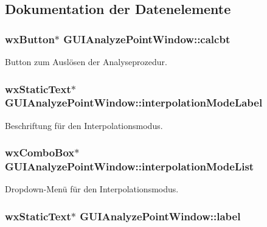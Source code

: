 \subsection{Dokumentation der Datenelemente}
\hypertarget{classGUIAnalyzePointWindow_a2650076436d57254fa9dd0df3783593e}{
\subsubsection[{calcbt}]{\setlength{\rightskip}{0pt plus 5cm}wx\-Button$\ast$ G\-U\-I\-Analyze\-Point\-Window\-::calcbt\hspace{0.3cm}{\ttfamily [private]}}}\label{classGUIAnalyzePointWindow_a2650076436d57254fa9dd0df3783593e}
Button zum Auslösen der Analyseprozedur. \hypertarget{classGUIAnalyzePointWindow_a6a1b5c74ab4aca0f3ccea3ef83043b35}{
\subsubsection[{interpolation\-Mode\-Label}]{\setlength{\rightskip}{0pt plus 5cm}wx\-Static\-Text$\ast$ G\-U\-I\-Analyze\-Point\-Window\-::interpolation\-Mode\-Label\hspace{0.3cm}{\ttfamily [private]}}}\label{classGUIAnalyzePointWindow_a6a1b5c74ab4aca0f3ccea3ef83043b35}
Beschriftung für den Interpolationsmodus. \hypertarget{classGUIAnalyzePointWindow_a6b2da34e788e56e70789d2cfc9767357}{
\subsubsection[{interpolation\-Mode\-List}]{\setlength{\rightskip}{0pt plus 5cm}wx\-Combo\-Box$\ast$ G\-U\-I\-Analyze\-Point\-Window\-::interpolation\-Mode\-List\hspace{0.3cm}{\ttfamily [private]}}}\label{classGUIAnalyzePointWindow_a6b2da34e788e56e70789d2cfc9767357}
Dropdown-\/\-Menü für den Interpolationsmodus. \hypertarget{classGUIAnalyzePointWindow_ae3f474800a7f7d9e4a897bdf33510f01}{
\subsubsection[{label}]{\setlength{\rightskip}{0pt plus 5cm}wx\-Static\-Text$\ast$ G\-U\-I\-Analyze\-Point\-Window\-::label\hspace{0.3cm}{\ttfamily [private]}}}\label{classGUIAnalyzePointWindow_ae3f474800a7f7d9e4a897bdf33510f01}
